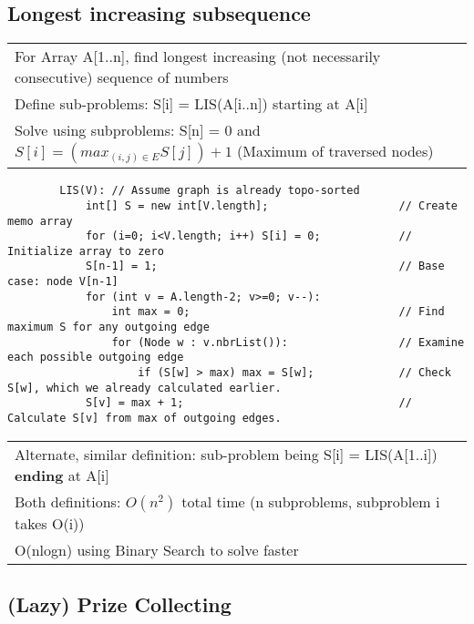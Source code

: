 \documentclass{article}
\begin{document}
    \subsection{Longest increasing subsequence}
    \begin{tabular}{l}
        For Array A[1..n], find longest increasing (not necessarily consecutive) sequence of numbers\\
        Define sub-problems: S[i] = LIS(A[i..n]) starting at A[i]\\
        Solve using subproblems: S[n] = 0 and $S[i] = (max_{(i,j) \in E} S[j]) + 1$ (Maximum of traversed nodes)\\
    \end{tabular}

    \begin{verbatim}
        LIS(V): // Assume graph is already topo-sorted
            int[] S = new int[V.length];                    // Create memo array
            for (i=0; i<V.length; i++) S[i] = 0;            // Initialize array to zero
            S[n-1] = 1;                                     // Base case: node V[n-1]
            for (int v = A.length-2; v>=0; v--):
                int max = 0;                                // Find maximum S for any outgoing edge
                for (Node w : v.nbrList()):                 // Examine each possible outgoing edge
                    if (S[w] > max) max = S[w];             // Check S[w], which we already calculated earlier.
            S[v] = max + 1;                                 // Calculate S[v] from max of outgoing edges.
    \end{verbatim}

    
    \begin{tabular}{l}
        Alternate, similar definition: sub-problem being S[i] = LIS(A[1..i]) \textbf{ending} at A[i]\\
        Both definitions: $O(n^{2})$ total time (n subproblems, subproblem i takes O(i))\\
        O(nlogn) using Binary Search to solve faster\\
    \end{tabular}

    \pagebreak

    \subsection{(Lazy) Prize Collecting}
\end{document}
